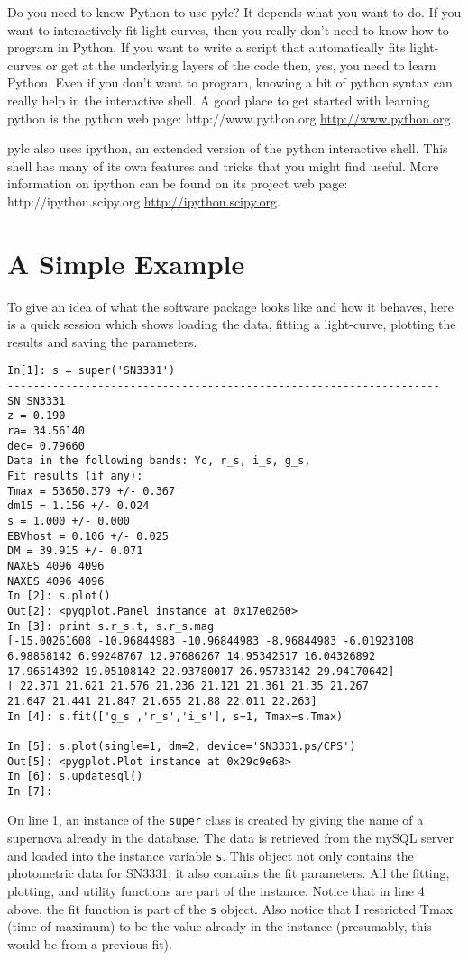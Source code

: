 \documentclass[12pt]{article}
\begin{document}
Do you need to know Python to use pylc? It depends what you want to
do. If you want to interactively fit light-curves, then you really
don't need to know how to program in Python. If you want to write
a script that automatically fits light-curves or get at the underlying
layers of the code then, yes, you need to learn Python. Even if you
don't want to program, knowing a bit of python syntax can really help
in the interactive shell. A good place to get started with learning
python is the python web page: http://www.python.org \url{http://www.python.org}.

pylc also uses ipython, an extended version of the python interactive
shell. This shell has many of its own features and tricks that you
might find useful. More information on ipython can be found on its
project web page: http://ipython.scipy.org \url{http://ipython.scipy.org}.


\section{A Simple Example}

To give an idea of what the software package looks like and how it
behaves, here is a quick session which shows loading the data, fitting
a light-curve, plotting the results and saving the parameters.

 \begin{verbatim}
In[1]: s = super('SN3331')
------------------------------------------------------------------- 
SN SN3331 
z = 0.190 
ra= 34.56140 
dec= 0.79660 
Data in the following bands: Yc, r_s, i_s, g_s, 
Fit results (if any): 
Tmax = 53650.379 +/- 0.367 
dm15 = 1.156 +/- 0.024 
s = 1.000 +/- 0.000 
EBVhost = 0.106 +/- 0.025 
DM = 39.915 +/- 0.071 
NAXES 4096 4096 
NAXES 4096 4096
In [2]: s.plot() 
Out[2]: <pygplot.Panel instance at 0x17e0260>
In [3]: print s.r_s.t, s.r_s.mag 
[-15.00261608 -10.96844983 -10.96844983 -8.96844983 -6.01923108
6.98858142 6.99248767 12.97686267 14.95342517 16.04326892
17.96514392 19.05108142 22.93780017 26.95733142 29.94170642] 
[ 22.371 21.621 21.576 21.236 21.121 21.361 21.35 21.267 
21.647 21.441 21.847 21.655 21.88 22.011 22.263]
In [4]: s.fit(['g_s','r_s','i_s'], s=1, Tmax=s.Tmax) 

In [5]: s.plot(single=1, dm=2, device='SN3331.ps/CPS') 
Out[5]: <pygplot.Plot instance at 0x29c9e68>
In [6]: s.updatesql()
In [7]: 
\end{verbatim}

On line 1, an instance of the \texttt{super} class is created by giving
the name of a supernova already in the database. The data is retrieved
from the mySQL server and loaded into the instance variable \texttt{s}.
This object not only contains the photometric data for SN3331, it
also contains the fit parameters. All the fitting, plotting, and utility
functions are part of the instance. Notice that in line 4 above, the
fit function is part of the \texttt{s} object. Also notice that I
restricted Tmax (time of maximum) to be the value already in the instance
(presumably, this would be from a previous fit).
\end{document}
